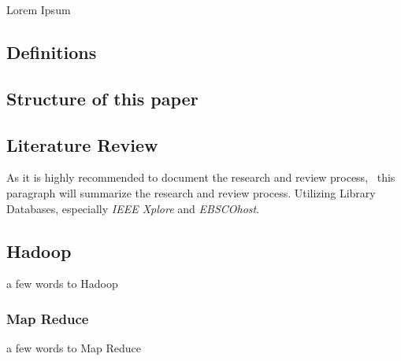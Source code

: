Lorem Ipsum

\subsection{Definitions}

\subsection{Structure of this paper}
\subsection{Literature Review}
	As it is highly recommended to document the research and review process,~\cite{brocke09} this paragraph will summarize the research and review process.
	Utilizing Library Databases, especially \emph{IEEE Xplore} and \emph{EBSCOhost}.
	
\subsection{Hadoop}
a few words to Hadoop
\subsubsection*{Map Reduce}
a few words to Map Reduce